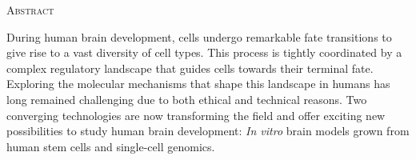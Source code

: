 \begin{center}
    \large\textsc{Abstract}
\end{center}

During human brain development, cells undergo remarkable fate transitions to give rise to a vast diversity of cell types. This process is tightly coordinated by a complex regulatory landscape that guides cells towards their terminal fate. Exploring the molecular mechanisms that shape this landscape in humans has long remained challenging due to both ethical and technical reasons. Two converging technologies are now transforming the field and offer exciting new possibilities to study human brain development: \textit{In vitro} brain models grown from human stem cells and single-cell genomics. 

